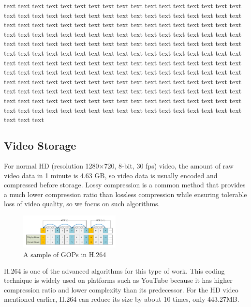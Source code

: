 \documentclass[sigconf]{acmart}
\begin{document}
{text text text text text text text text text text text text text text text text text text text text text text text text text text text text text text text text text text text text text text text text text text text text text text text text text text text text text text text text text text text text text text text text text text text text text text text text text text text text text text text text text text text text text text text text text text text text text text text text text text text text text text text text text text text text text text text text text text text text text text text text text text text text text text text text text text text text text text text text text text text text text text text text text text text text text text text text text text text text text text text text text text text text text text text text text text text text text text text text text text text text text text text text text text text text text text text text text text text text text text text text text text text text text text text }

\subsection{Video Storage}\label{video storage}

For normal HD (resolution 1280$\times$720, 8-bit, 30 fps) video, the amount of raw video data in 1 minute is 4.63 GB, so video data is usually encoded and compressed before storage. Lossy compression is a common method that provides a much lower compression ratio than lossless compression while ensuring tolerable loss of video quality, so we focus on such algorithms.

\begin{figure}[ht]
\centering
\includegraphics[width=0.45\textwidth]{photo/H264_IPB.pdf}
\caption{A sample of GOPs in H.264}
\label{H264-IPB}
\end{figure}

H.264 is one of the advanced algorithms for this type of work. This coding technique is widely used on platforms such as YouTube because it has higher compression ratio and lower complexity than its predecessor. For the HD video mentioned earlier, H.264 can reduce its size by about 10 times, only 443.27MB.
\end{document}
